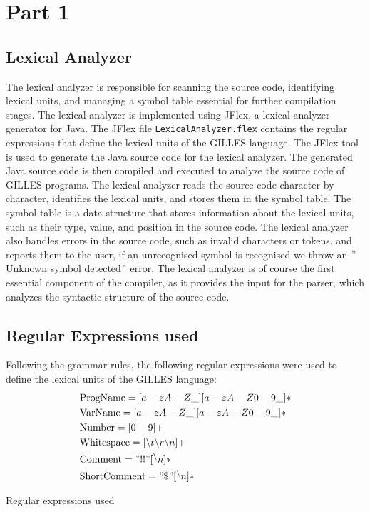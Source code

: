 \setcounter{secnumdepth}{3}

	\section{Part 1}
	\subsection{Lexical Analyzer}
	The lexical analyzer is responsible for scanning the source code, identifying lexical units,
	and managing a symbol table essential for further compilation stages.
	The lexical analyzer is implemented using JFlex, a lexical analyzer generator for Java.
	The JFlex file \texttt{LexicalAnalyzer.flex} contains the regular expressions that define the lexical units of the GILLES language.
	The JFlex tool is used to generate the Java source code for the lexical analyzer.
	The generated Java source code is then compiled and executed to analyze the source code of GILLES programs.
	The lexical analyzer reads the source code character by character, identifies the lexical units, and stores them in the symbol table.
	The symbol table is a data structure that stores information about the lexical units, such as their type, value, and position in the source code.
	The lexical analyzer also handles errors in the source code, such as invalid characters or tokens, and reports them to the user, if an unrecognised symbol is recognised we throw an \("\)Unknown symbol detected\("\) error.
	The lexical analyzer is of course the first essential component of the compiler, as it provides the input for the parser, which analyzes the syntactic structure of the source code.\\

	\subsection{Regular Expressions used}
	Following the grammar rules, the following regular expressions were used to define the lexical units of the GILLES language:
	\begin{align*}
		&\text{ProgName}     = [a-zA-Z\_][a-zA-Z0-9\_]* \\
		&\text{VarName}      = [a-zA-Z\_][a-zA-Z0-9\_]* \\
		&\text{Number}       = [0-9]+ \\
		&\text{Whitespace}   = [ \text{\textbackslash} t\text{\textbackslash} r\text{\textbackslash} n]+ \\
		&\text{Comment}      = "!!"[^\text{\textbackslash} n]* \\
		&\text{ShortComment} = "\$"[^\text{\textbackslash} n]*
	\end{align*}
    \begin{table}[h]
		\centering
		\caption{Regular expressions used}
	\end{table}

